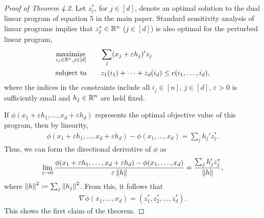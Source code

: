 \begin{proof}[Proof of Theorem 4.2]
Let $z_j^*$, for $j\in[d]$, denote an optimal solution to the dual linear program of equation 5 in the main paper.  Standard sensitivity analysis of linear programs implies that $z_j^*\in\mathbb{R}^{n}$ ($j\in[d]$) is
 also optimal for the perturbed linear program,
\begin{alignat*}{2}\begin{split}
&\underset{z_j\in\mathbb{R}^n, j\in[d]}{\textrm{maximize}}\qquad\sum_{j} (x_j+\varepsilon h_j)'z_j\\
&\textrm{subject to}\qquad z_{1}(i_1)+\cdots+z_{d}(i_{d})\leq c(i_1,\ldots,i_{d}),\end{split}
\end{alignat*}
where the indices in the constraints include all $i_j\in[n]$, $j\in[d]$, $\varepsilon>0$ is sufficiently small and $h_j\in \mathbb{R}^{n}$ are held fixed.

If $\phi(x_1+\varepsilon h_1,\ldots,x_{d}+\varepsilon h_{d})$ represents the optimal objective value of this program, then by linearity, 
\begin{align*}
    \phi(x_1+\varepsilon h_1,\ldots,x_{d}+\varepsilon h_{d}) - \phi(x_1,\ldots,x_{d}) = \sum_{j} h_j'z^*_j.
\end{align*}
Thus, we can form the directional derivative of $\phi$ as
\begin{align*}
\lim_{\varepsilon\rightarrow 0}\frac{  \phi(x_1+\varepsilon h_1,\ldots,x_{d}+\varepsilon h_{d}) - \phi(x_1,\ldots,x_{d}) }{\varepsilon\left\|h\right\|}
=\frac{\sum_{j} h_j'z^*_j}{\left\|h\right\|},
\end{align*}
where $\left\|h\right\|^2\coloneqq \sum_{j}\left\|h_j\right\|^2$.
From this, it follows that 
\begin{align*}
    \nabla \phi(x_1,\ldots,x_{d}) = (z_1^*, z_2^*,\ldots, z_{d}^*).\end{align*}
This shows the first claim of the theorem.


\end{proof}
